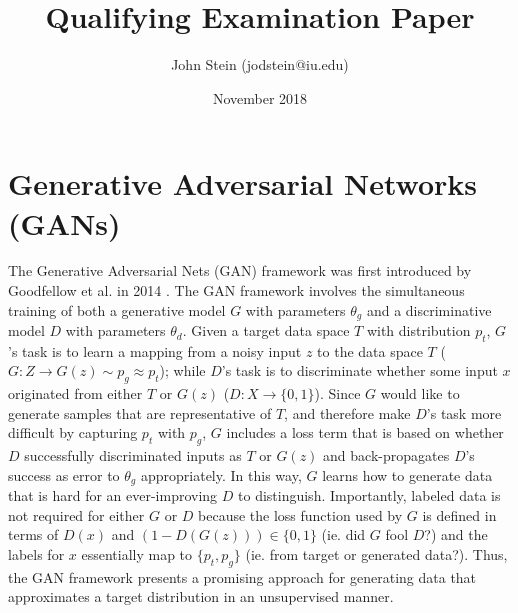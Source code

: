 \documentclass[11pt]{article}
\title{Qualifying Examination Paper}
\author{John Stein (jodstein@iu.edu)}
\date{November 2018}
\begin{document}
\begin{titlepage}
    \null
    \nointerlineskip
    \vfill
    \let\snewpage \newpage
    \let\newpage \relax
    \maketitle
    \let \newpage \snewpage
    \vfill
    \thispagestyle{empty}
\end{titlepage}


\tableofcontents
\thispagestyle{empty}


\newpage
\setcounter{page}{1}
\section{Generative Adversarial Networks (GANs)}

The Generative Adversarial Nets (GAN) framework was first introduced by Goodfellow et al. in 2014 \cite{NIPS2014_5423}.  The GAN framework involves the simultaneous training of both a generative model $G$ with parameters $\theta_g$ and a discriminative model $D$ with parameters $\theta_d$.  Given a target data space $T$ with distribution $p_t$, $G$'s task is to learn a mapping from a noisy input $z$ to the data space $T$ ($G:Z \rightarrow G(z) \sim p_g \approx p_t$); while $D$'s task is to discriminate whether some input $x$ originated from either $T$ or $G(z)$ ($D: X \rightarrow \{0, 1\}$).  Since $G$ would like to generate samples that are representative of $T$, and therefore make $D$'s task more difficult by capturing $p_t$ with $p_g$, $G$ includes a loss term that is based on whether $D$ successfully discriminated inputs as $T$ or $G(z)$ and back-propagates $D$'s success as error to $\theta_g$ appropriately.  In this way, $G$ learns how to generate data that is hard for an ever-improving $D$ to distinguish.  Importantly, labeled data is not required for either $G$ or $D$ because the loss function used by $G$ is defined in terms of $D(x)$ and $(1-D(G(z))) \in \{0, 1\}$ (ie. did $G$ fool $D$?) and the labels for $x$ essentially map to $\{p_t, p_g\}$ (ie. from target or generated data?).  Thus, the GAN framework presents a promising approach for generating data that approximates a target distribution in an unsupervised manner.
\end{document}
